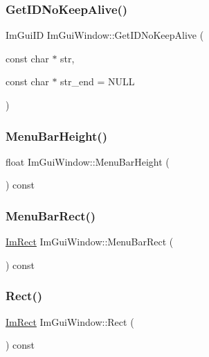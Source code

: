 \subsubsection{\texorpdfstring{Get\+I\+D\+No\+Keep\+Alive()}{GetIDNoKeepAlive()}}
{\footnotesize\ttfamily Im\+Gui\+ID Im\+Gui\+Window\+::\+Get\+I\+D\+No\+Keep\+Alive (\begin{DoxyParamCaption}\item[{const char $\ast$}]{str,  }\item[{const char $\ast$}]{str\+\_\+end = {\ttfamily NULL} }\end{DoxyParamCaption})}

\hypertarget{struct_im_gui_window_acfb8bdad2e3ea6102589813ae32d0364}{}\label{struct_im_gui_window_acfb8bdad2e3ea6102589813ae32d0364} 
\subsubsection{\texorpdfstring{Menu\+Bar\+Height()}{MenuBarHeight()}}
{\footnotesize\ttfamily float Im\+Gui\+Window\+::\+Menu\+Bar\+Height (\begin{DoxyParamCaption}{ }\end{DoxyParamCaption}) const}

\hypertarget{struct_im_gui_window_a59df76c1445aaaf0b43456c83c1a88e5}{}\label{struct_im_gui_window_a59df76c1445aaaf0b43456c83c1a88e5} 
\subsubsection{\texorpdfstring{Menu\+Bar\+Rect()}{MenuBarRect()}}
{\footnotesize\ttfamily \hyperlink{struct_im_rect}{Im\+Rect} Im\+Gui\+Window\+::\+Menu\+Bar\+Rect (\begin{DoxyParamCaption}{ }\end{DoxyParamCaption}) const}

\hypertarget{struct_im_gui_window_a147da28bf5d167cbe0a363c4a578dea1}{}\label{struct_im_gui_window_a147da28bf5d167cbe0a363c4a578dea1} 
\subsubsection{\texorpdfstring{Rect()}{Rect()}}
{\footnotesize\ttfamily \hyperlink{struct_im_rect}{Im\+Rect} Im\+Gui\+Window\+::\+Rect (\begin{DoxyParamCaption}{ }\end{DoxyParamCaption}) const}

